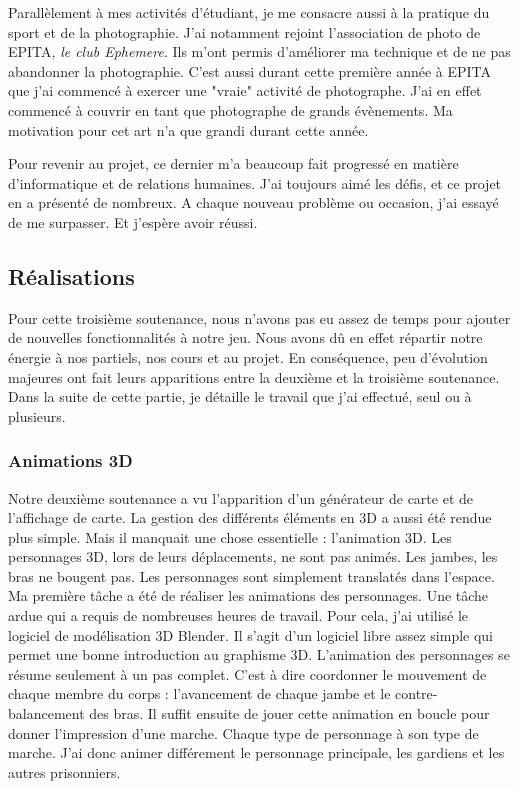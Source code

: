 \documentclass[12pt]{article}
\begin{document}
Parallèlement à mes activités d'étudiant, je me consacre aussi à la pratique du sport et de la photographie. J'ai notamment rejoint l'association de photo de EPITA, \textit{le club Ephemere}. Ils m'ont permis d'améliorer ma technique et de ne pas abandonner la photographie. C'est aussi durant cette première année à EPITA que j'ai commencé à exercer une "vraie" activité de photographe. J'ai en effet commencé à couvrir en tant que photographe de grands évènements. Ma motivation pour cet art n'a que grandi durant cette année.

Pour revenir au projet, ce dernier m'a beaucoup fait progressé en matière d'informatique et de relations humaines. J'ai toujours aimé les défis, et ce projet en a présenté de nombreux. A chaque nouveau problème ou occasion, j'ai essayé de me surpasser. Et j'espère avoir réussi.

\newpage

\subsection{Réalisations}

Pour cette troisième soutenance, nous n'avons pas eu assez de temps pour ajouter de nouvelles fonctionnalités à notre jeu. Nous avons dû en effet répartir notre énergie à nos partiels, nos cours et au projet. En conséquence, peu d'évolution majeures ont fait leurs apparitions entre la deuxième et la troisième soutenance. Dans la suite de cette partie, je détaille le travail que j'ai effectué, seul ou à plusieurs.

\subsubsection{Animations 3D}



Notre deuxième soutenance a vu l'apparition d'un générateur de carte et de l'affichage de carte. La gestion des différents éléments en 3D a aussi été rendue plus simple. Mais il manquait une chose essentielle : l'animation 3D. Les personnages 3D, lors de leurs déplacements, ne sont pas animés. Les jambes, les bras ne bougent pas. Les personnages sont simplement translatés dans l'espace. Ma première tâche a été de réaliser les animations des personnages. Une tâche ardue qui a requis de nombreuses heures de travail. Pour cela, j'ai utilisé le logiciel de modélisation 3D Blender. Il s'agit d'un logiciel libre assez simple qui permet une bonne introduction au graphisme 3D. L'animation des personnages se résume seulement à un pas complet. C'est à dire coordonner le mouvement de chaque membre du corps : l'avancement de chaque jambe et le contre-balancement des bras. Il suffit ensuite de jouer cette animation en boucle pour donner l'impression d'une marche. Chaque type de personnage à son type de marche. J'ai donc animer différement le personnage principale, les gardiens et les autres prisonniers. 
\end{document}
